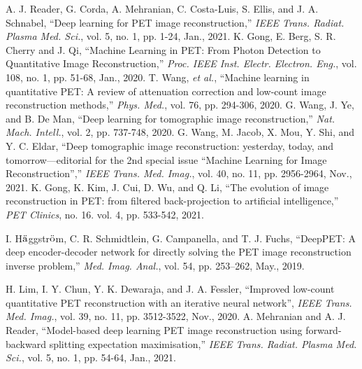 \documentclass[]{IEEETran}
\begin{document}
\begin{thebibliography}{00}
		 A. J. Reader, G. Corda, A. Mehranian, C. Costa-Luis, S. Ellis, and J. A. Schnabel, ``Deep learning for PET image reconstruction,'' \emph{IEEE Trans. Radiat. Plasma Med. Sci.}, vol. 5, no. 1, pp. 1-24, Jan., 2021.
		 K. Gong, E. Berg, S. R. Cherry and J. Qi, ``Machine Learning in PET: From Photon Detection to Quantitative Image Reconstruction,'' \emph{Proc. IEEE Inst. Electr. Electron. Eng.}, vol. 108, no. 1, pp. 51-68, Jan., 2020.
		 T. Wang, \emph{et al.}, 	``Machine learning in quantitative PET: A review of attenuation correction and low-count image reconstruction methods,'' \emph{Phys. Med.}, vol. 76, pp. 294-306, 2020. 
		 G. Wang, J. Ye, and B. De Man, ``Deep learning for tomographic image reconstruction,'' \emph{Nat. Mach. Intell.}, vol. 2, pp. 737-748, 2020.
		 G. Wang, M. Jacob, X. Mou, Y. Shi, and Y. C. Eldar, ``Deep tomographic image reconstruction: yesterday, today, and tomorrow—editorial for the 2nd special issue “Machine Learning for Image Reconstruction”,'' \emph{IEEE Trans. Med. Imag.}, vol. 40, no. 11, pp. 2956-2964, Nov., 2021.
		 K. Gong, K. Kim, J. Cui, D. Wu, and Q. Li, ``The evolution of image reconstruction in PET: from filtered back-projection to artificial intelligence,'' \emph{PET Clinics}, no. 16. vol. 4, pp. 533-542, 2021.
		
		 I. H$\ddot{\rm a}$ggstr$\ddot{\rm o}$m, C. R. Schmidtlein, G. Campanella, and T. J. Fuchs, ``DeepPET: A deep encoder-decoder network for directly solving the PET image reconstruction inverse problem,'' \emph{Med. Imag. Anal.}, vol. 54, pp. 253–262, May., 2019.
		
		 H. Lim, I. Y. Chun, Y. K. Dewaraja, and J. A. Fessler, ``Improved low-count quantitative PET reconstruction with an iterative neural network'', \emph{IEEE Trans. Med. Imag.}, vol. 39, no. 11, pp. 3512-3522, Nov., 2020.
		 A. Mehranian and A. J. Reader, ``Model-based deep learning PET image reconstruction using forward-backward splitting expectation maximisation,'' \emph{IEEE Trans. Radiat. Plasma Med. Sci.}, vol. 5, no. 1, pp. 54-64, Jan., 2021.
		

\end{thebibliography}
\end{document}
